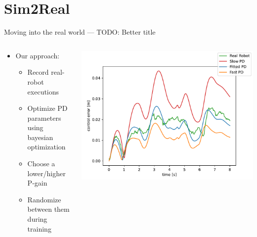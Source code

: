 \documentclass[16:9,en,navbarinfooter]{sdqbeamer}
\begin{document}
\section{Sim2Real}
\begin{frame}{Moving into the real world --- TODO: Better title}
\begin{columns}
    \begin{column}{0.5\textwidth}
        \begin{itemize}
                \item Our approach:
                    \begin{itemize}
                            \item Record real-robot executions
                            \item Optimize PD parameters using bayesian optimization
                            \item Choose a lower/higher P-gain
                            \item Randomize between them during training
                    \end{itemize}
        \end{itemize}
    \end{column}

    \begin{column}{0.5\textwidth}
\includegraphics[width=\linewidth]{media/ctrl_error.pdf}\\
    \end{column}
\end{columns}

\end{frame}
\end{document}
